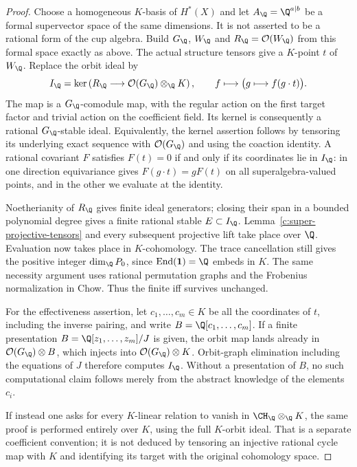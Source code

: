 \begin{proof}
Choose a homogeneous $K$-basis of $H^*(X)$ and let
$A_\Q=\Q^{a|b}$ be a formal supervector space of the same
dimensions.  It is not asserted to be a rational form of the cup
algebra.  Build $G_\Q$, $W_\Q$ and $R_\Q=\mathcal O(W_\Q)$
from this formal space exactly as above.  The actual structure
tensors give a $K$-point $t$ of $W_\Q$.  Replace the orbit ideal by
\[
 I_\Q=\ker\left(R_\Q\longrightarrow
        \mathcal O(G_\Q)\otimes_\Q K\right),
 \qquad f\longmapsto\bigl(g\longmapsto f(g\cdot t)\bigr).
\]
The map is a $G_\Q$-comodule map, with the regular action on the
first target factor and trivial action on the coefficient field.
Its kernel is consequently a rational $G_\Q$-stable ideal.
Equivalently, the kernel assertion follows by tensoring its
underlying exact sequence with $\mathcal O(G_\Q)$ and using the
coaction identity.  A rational covariant $F$ satisfies $F(t)=0$
if and only if its coordinates lie in $I_\Q$: in one direction
equivariance gives $F(g\cdot t)=gF(t)$ on all superalgebra-valued
points, and in the other we evaluate at the identity.

Noetherianity of $R_\Q$ gives finite ideal generators; closing
their span in a bounded polynomial degree gives a finite rational
stable $E\subset I_\Q$.  Lemma~\ref{c:super-projective-tensors}
and every subsequent projective lift take place over $\Q$.
Evaluation now takes place in $K$-cohomology.  The trace cancellation
still gives the positive integer $\dim_\Q P_0$, since
$\operatorname{End}(\mathbf1)=\Q$ embeds in $K$.
The same necessity argument uses rational permutation graphs and
the Frobenius normalization in Chow.  Thus the finite iff survives
unchanged.

For the effectiveness assertion, let $c_1,\ldots,c_m\in K$ be
all the coordinates of $t$, including the inverse pairing, and
write $B=\Q[c_1,\ldots,c_m]$.  If a finite presentation
$B=\Q[z_1,\ldots,z_m]/J$ is given, the orbit map lands already
in $\mathcal O(G_\Q)\otimes B$, which injects into
$\mathcal O(G_\Q)\otimes K$.  Orbit-graph elimination including
the equations of $J$ therefore computes $I_\Q$.  Without a
presentation of $B$, no such computational claim follows merely
from the abstract knowledge of the elements $c_i$.

If instead one asks for every $K$-linear relation to vanish in
$\CH_\Q\otimes_\Q K$, the same proof is performed entirely over
$K$, using the full $K$-orbit ideal.  That is a separate
coefficient convention; it is not deduced by tensoring an
injective rational cycle map with $K$ and identifying its target
with the original cohomology space.
\end{proof}

